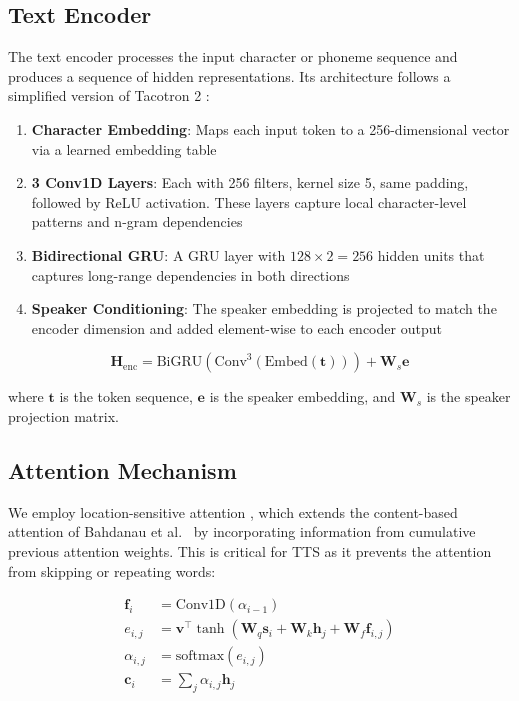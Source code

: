 \documentclass[conference]{IEEEtran}
\begin{document}
\subsection{Text Encoder}

The text encoder processes the input character or phoneme sequence and produces a sequence of hidden representations. Its architecture follows a simplified version of Tacotron 2 \cite{shen2018tacotron2}:

\begin{enumerate}
\item \textbf{Character Embedding}: Maps each input token to a 256-dimensional vector via a learned embedding table
\item \textbf{3 Conv1D Layers}: Each with 256 filters, kernel size 5, same padding, followed by ReLU activation. These layers capture local character-level patterns and n-gram dependencies
\item \textbf{Bidirectional GRU}: A GRU layer with $128 \times 2 = 256$ hidden units that captures long-range dependencies in both directions
\item \textbf{Speaker Conditioning}: The speaker embedding is projected to match the encoder dimension and added element-wise to each encoder output
\end{enumerate}

\begin{equation}
\mathbf{H}_{\text{enc}} = \text{BiGRU}(\text{Conv}^3(\text{Embed}(\mathbf{t}))) + \mathbf{W}_s \mathbf{e}
\end{equation}

where $\mathbf{t}$ is the token sequence, $\mathbf{e}$ is the speaker embedding, and $\mathbf{W}_s$ is the speaker projection matrix.

\subsection{Attention Mechanism}

We employ location-sensitive attention \cite{chorowski2015attention}, which extends the content-based attention of Bahdanau et al.~\cite{bahdanau2015attention} by incorporating information from cumulative previous attention weights. This is critical for TTS as it prevents the attention from skipping or repeating words:

\begin{align}
\mathbf{f}_i &= \text{Conv1D}(\alpha_{i-1}) \\
e_{i,j} &= \mathbf{v}^\top \tanh(\mathbf{W}_q \mathbf{s}_i + \mathbf{W}_k \mathbf{h}_j + \mathbf{W}_f \mathbf{f}_{i,j}) \\
\alpha_{i,j} &= \text{softmax}(e_{i,j}) \\
\mathbf{c}_i &= \sum_j \alpha_{i,j} \mathbf{h}_j
\end{align}
\end{document}
